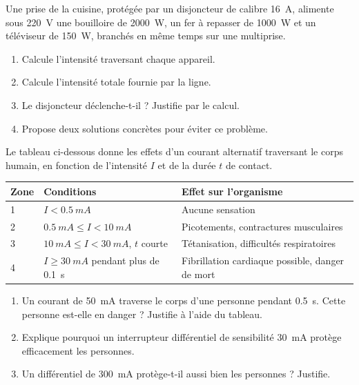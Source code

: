 \documentclass[11pt]{article}
\begin{document}
\begin{exercice}
Une prise de la cuisine, protégée par un disjoncteur de calibre \SI{16}{A}, alimente sous \SI{220}{V} une bouilloire de \SI{2000}{W}, un fer à repasser de \SI{1000}{W} et un téléviseur de \SI{150}{W}, branchés en même temps sur une multiprise.
\begin{enumerate}
\item Calcule l'intensité traversant chaque appareil.
\item Calcule l'intensité totale fournie par la ligne.
\item Le disjoncteur déclenche-t-il ? Justifie par le calcul.
\item Propose deux solutions concrètes pour éviter ce problème.
\end{enumerate}
\end{exercice}

\begin{exercice}
Le tableau ci-dessous donne les effets d'un courant alternatif traversant le corps humain, en fonction de l'intensité $I$ et de la durée $t$ de contact.
\begin{center}
\begin{tabularx}{\linewidth}{|l|X|X|}\hline
\rowcolor{popblueL}
\textbf{Zone} & \textbf{Conditions} & \textbf{Effet sur l'organisme} \\ \hline
1 & $I < \SI{0,5}{mA}$ & Aucune sensation \\ \hline
2 & $\SI{0,5}{mA} \le I < \SI{10}{mA}$ & Picotements, contractures musculaires \\ \hline
3 & $\SI{10}{mA} \le I < \SI{30}{mA}$, $t$ courte & Tétanisation, difficultés respiratoires \\ \hline
4 & $I \ge \SI{30}{mA}$ pendant plus de \SI{0,1}{s} & Fibrillation cardiaque possible, danger de mort \\ \hline
\end{tabularx}
\end{center}
\begin{enumerate}
\item Un courant de \SI{50}{mA} traverse le corps d'une personne pendant \SI{0,5}{s}. Cette personne est-elle en danger ? Justifie à l'aide du tableau.
\item Explique pourquoi un interrupteur différentiel de sensibilité \SI{30}{mA} protège efficacement les personnes.
\item Un différentiel de \SI{300}{mA} protège-t-il aussi bien les personnes ? Justifie.
\end{enumerate}
\end{exercice}
\end{document}
